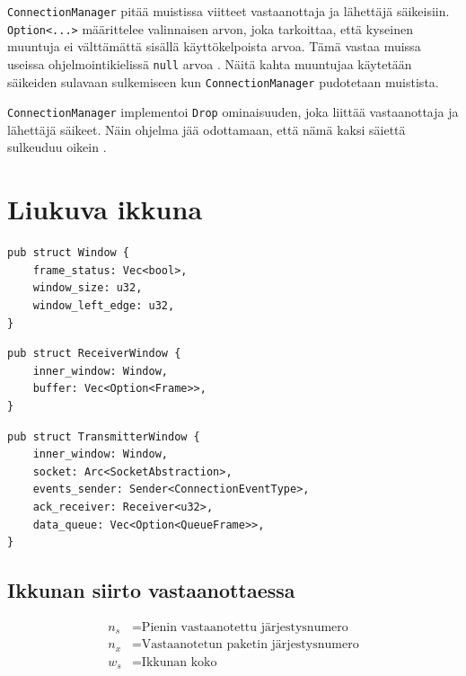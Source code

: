 \documentclass[a4paper,12pt]{article}
\begin{document}
    \lstinline{ConnectionManager} pitää muistissa viitteet vastaanottaja ja lähettäjä säikeisiin.
    \lstinline{Option<...>} määrittelee valinnaisen arvon, joka tarkoittaa, että kyseinen muuntuja ei 
    välttämättä sisällä käyttökelpoista arvoa. Tämä vastaa muissa useissa ohjelmointikielissä \lstinline{null} arvoa \cite{rust_book_enum}. Näitä kahta muuntujaa käytetään säikeiden sulavaan sulkemiseen kun \lstinline{ConnectionManager} pudotetaan muistista. 

    \lstinline{ConnectionManager} implementoi \lstinline{Drop} ominaisuuden, joka liittää vastaanottaja
    ja lähettäjä säikeet. Näin ohjelma jää odottamaan, että nämä kaksi säiettä sulkeuduu oikein \cite{rust_doc_joinhandle}.
        
    \section{Liukuva ikkuna}\label{sec:liukuva_ikkuna}
    \begin{lstlisting}[caption={Ikkunan rakenne}, label={lst:window}]
pub struct Window {
    frame_status: Vec<bool>,
    window_size: u32,
    window_left_edge: u32,
}\end{lstlisting}


    \begin{lstlisting}[caption={Vastaanottajan ikkunan rakenne}, label={lst:rwindow}]
pub struct ReceiverWindow {
    inner_window: Window,
    buffer: Vec<Option<Frame>>,
}\end{lstlisting}

    \begin{lstlisting}[caption={Lähettävän ikkunan rakenne}, label={lst:twindow}]
pub struct TransmitterWindow {
    inner_window: Window,
    socket: Arc<SocketAbstraction>,
    events_sender: Sender<ConnectionEventType>,
    ack_receiver: Receiver<u32>,
    data_queue: Vec<Option<QueueFrame>>,
}\end{lstlisting}

    \subsection{Ikkunan siirto vastaanottaessa}

    \begin{align}
        n_s &= \text{Pienin vastaanotettu järjestysnumero} \\
        n_x &= \text{Vastaanotetun paketin järjestysnumero} \\
        w_s &= \text{Ikkunan koko}
    \end{align}
\end{document}
